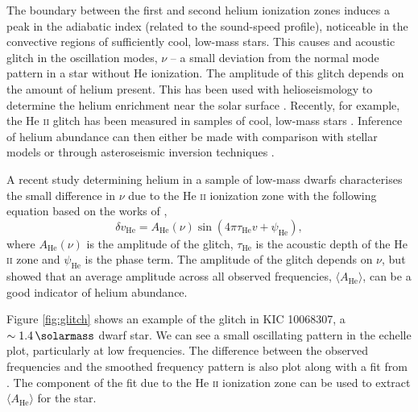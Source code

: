 The boundary between the first and second helium ionization zones induces a peak in the adiabatic index (related to the sound-speed profile), noticeable in the convective regions of sufficiently cool, low-mass stars. This causes and acoustic glitch in the oscillation modes, $\nu$ -- a small deviation from the normal mode pattern in a star without He ionization. The amplitude of this glitch depends on the amount of helium present. This has been used with helioseismology to determine the helium enrichment near the solar surface \citep{Basu.Antia1995, Basu.Antia2004}. Recently, for example, the He \textsc{ii} glitch has been measured in samples of cool, low-mass stars \citep{Mazumdar.Monteiro.ea2014, Corsaro.DeRidder.ea2015, Verma.Raodeo.ea2017}. Inference of helium abundance can then either be made with comparison with stellar models or through asteroseismic inversion techniques \citep[e.g. for a the 16Cyg binary star system][]{Verma.Faria.ea2014, Buldgen.Salmon.ea2016}.

A recent study determining helium in a sample of low-mass dwarfs \citep{Verma.Raodeo.ea2019} characterises the small difference in $\nu$ due to the He \textsc{ii} ionization zone with the following equation based on the works of \citep{Houdek.Gough2007},
\begin{equation}
    \delta v_{\mathrm{He}}=A_{\mathrm{He}}(\nu) \sin \left(4 \pi \tau_{\mathrm{He}} v+\psi_{\mathrm{He}}\right),
\end{equation}
where $A_{\mathrm{He}}(\nu)$ is the amplitude of the glitch, $\tau_{\mathrm{He}}$ is the acoustic depth of the He \textsc{ii} zone and $\psi_{\mathrm{He}}$ is the phase term. The amplitude of the glitch depends on $\nu$, but \citet{Verma.Raodeo.ea2019} showed that an average amplitude across all observed frequencies, $\langle A_{\mathrm{He}} \rangle$, can be a good indicator of helium abundance.

Figure \ref{fig:glitch} shows an example of the glitch in KIC 10068307, a $\sim \SI{1.4}{\solarmass}$ dwarf star. We can see a small oscillating pattern in the echelle plot, particularly at low frequencies. The difference between the observed frequencies and the smoothed frequency pattern is also plot along with a fit from \citet{Verma.Raodeo.ea2017}. The component of the fit due to the He \textsc{ii} ionization zone can be used to extract $\langle A_{\mathrm{He}} \rangle$ for the star. 

